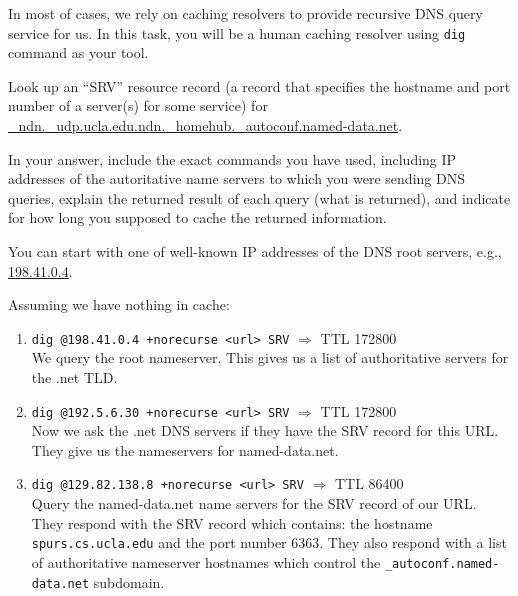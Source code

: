 \documentclass{report}
\begin{document}
\clearpage
\begin{problem}

In most of cases, we rely on caching resolvers to provide recursive DNS query
service for us. In this task, you will be a human caching resolver using
\verb|dig| command as your tool.

Look up an ``SRV'' resource record (a record that specifies the hostname and
port number of a server(s) for some service) for
\url{_ndn._udp.ucla.edu.ndn._homehub._autoconf.named-data.net}.

In your answer, include the exact commands you have used, including IP
addresses of the autoritative name servers to which you were sending DNS
queries, explain the returned result of each query (what is returned), and
indicate for how long you supposed to cache the returned information.

You can start with one of well-known IP addresses of the DNS root servers,
e.g., \url{198.41.0.4}.

\begin{answer}{30em}
  Assuming we have nothing in cache: \\
  \begin{enumerate}
  \item \texttt{dig @198.41.0.4 +norecurse <url> SRV} $\Rightarrow$ TTL 172800 \\
        We query the root nameserver. This gives us a list of authoritative
        servers for the .net TLD.

  \item \texttt{dig @192.5.6.30 +norecurse <url> SRV} $\Rightarrow$ TTL 172800 \\
        Now we ask the .net DNS servers if they have the SRV record for this
        URL. They give us the nameservers for named-data.net.

  \item \texttt{dig @129.82.138.8 +norecurse <url> SRV} $\Rightarrow$ TTL 86400 \\
        Query the named-data.net name servers for the SRV record of our URL.
        They respond with the SRV record which contains: the hostname
        \texttt{spurs.cs.ucla.edu} and the port number 6363. They also respond
        with a list of authoritative nameserver hostnames which control the
        \texttt{\_autoconf.named-data.net} subdomain.
  \end{enumerate}
\end{answer}

\end{problem}
\end{document}

